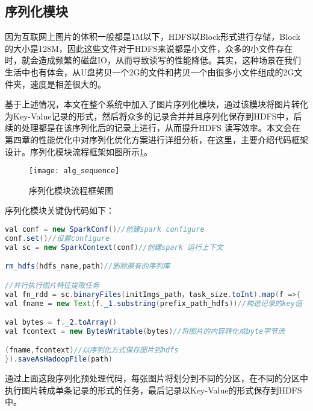 \subsection{序列化模块}
因为互联网上图片的体积一般都是1M以下，HDFS以Block形式进行存储，Block的大小是128M，因此这些文件对于HDFS来说都是小文件，众多的小文件存在时，就会造成频繁的磁盘IO，从而导致读写的性能降低。其实，这种场景在我们生活中也有体会，从U盘拷贝一个2G的文件和拷贝一个由很多小文件组成的2G文件夹，速度是相差很大的。

基于上述情况，本文在整个系统中加入了图片序列化模块，通过该模块将图片转化为Key-Value记录的形式，然后将众多的记录合并并且序列化保存到HDFS中，后续的处理都是在该序列化后的记录上进行，从而提升HDFS 读写效率。本文会在第四章的性能优化中对序列化优化方案进行详细分析，在这里，主要介绍代码框架设计。序列化模块流程框架如图所示\ref{fig:alg_sequence}。
\begin{figure}[htp]
\centering
\texttt{[image: alg\_sequence]}
\caption{序列化模块流程框架图}
\label{fig:alg_sequence}
\end{figure}

序列化模块关键伪代码如下：
\begin{lstlisting}[language=Java]
val conf = new SparkConf()//创建spark configure
conf.set()//设置configure
val sc = new SparkContext(conf)//创建spark 运行上下文

rm_hdfs(hdfs_name,path)//删除原有的序列库

//并行执行图片特征提取任务
val fn_rdd = sc.binaryFiles(initImgs_path，task_size.toInt).map(f =>{
val fname = new Text(f._1.substring(prefix_path_hdfs))//构造记录的key值

val bytes = f._2.toArray()
val fcontext = new BytesWritable(bytes)//将图片的内容转化成byte字节流

(fname,fcontext)//以序列化方式保存图片到hdfs
}).saveAsHadoopFile(path)
\end{lstlisting}

通过上面这段序列化预处理代码，每张图片将划分到不同的分区，在不同的分区中执行图片转成单条记录的形式的任务，最后记录以Key-Value的形式保存到HDFS 中。
